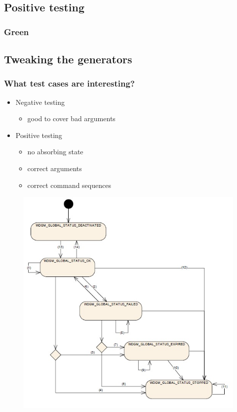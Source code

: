 \documentclass{beamer}
\begin{document}
\subsection{Positive testing}

\begin{frame}
  \frametitle{Green}
\end{frame}

\subsection{Tweaking the generators}

\begin{frame}
  \frametitle{What test cases are interesting?}
  \begin{itemize}
    \item Negative testing
    \begin{itemize}
      \item good to cover bad arguments
    \end{itemize}
    \item Positive testing
    \begin{itemize}
      \item no absorbing state
      \item correct arguments
      \item correct command sequences
    \end{itemize}
  \end{itemize}
\end{frame}

\begin{frame}
  \begin{figure}
    \includegraphics[keepaspectratio, width=0.7\linewidth]{globalstatuses}
  \end{figure}
\end{frame}
\end{document}
